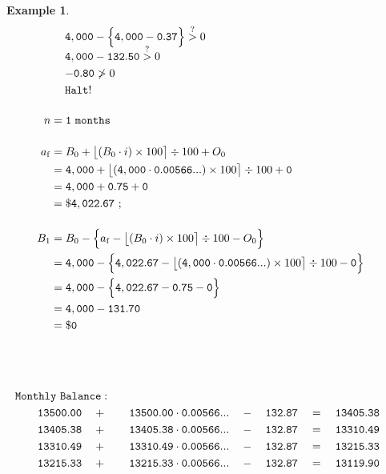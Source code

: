\documentclass[12pt,letterpaper,oneside]{article}
\newtheorem{example}{Example}[section]
\theoremstyle{remark} %
\begin{document}
\begin{example}
\begin{align*}
	&\quad\;\mathtt{\balanceitf}-\Big\{\mathtt{\amount}-\mathtt{0.37}\Big\}\overset{?}{>}0\\[-6pt]
	&\quad\;\mathtt{\balanceitf}-\mathtt{132.50}\overset{?}{>}0\\
	&\quad\;\mathtt{-0.80}\ngtr 0\\
	&\quad\;\mathtt{Halt!}\\[12pt]
	n&=\mathtt{\monthspitf\ months}\\[12pt]
	a_{\rm{f}}&=B_{\monthsitf}+\big\lfloor{\left(B_{\monthsitf}\cdot i\right)\times 100}\big\rceil\div 100+O_{\monthsitf}\\
	&=\mathtt{\balanceitf}+\big\lfloor{\left(\mathtt{\balanceitf}\cdot \mathtt{\rate}\right)\times 100}\big\rceil\div 100+\mathtt{\interestitf}\\
	&=\mathtt{\balanceitf}+\mathtt{0.75}+\mathtt{\interestitf}\\
	&=\mathtt{\$\amountfinal}\ ;\\[12pt]
	B_{\monthspitf}&=B_{\monthsitf}-\Big\{a_{\rm{f}}-\big\lfloor{\left(B_{\monthsitf}\cdot i\right)\times 100}\big\rceil\div 100-O_{\monthsitf}\Big\}\\
	&=\mathtt{\balanceitf}-\Big\{\mathtt{\amountfinal}-\big\lfloor{\left(\mathtt{\balanceitf}\cdot \mathtt{\rate}\right)\times 100}\big\rceil\div 100-\mathtt{\interestitf}\Big\}\\
	&=\mathtt{\balanceitf}-\Big\{\mathtt{\amountfinal}-\mathtt{0.75}-\mathtt{\interestitf}\Big\}\\
	&=\mathtt{\balanceitf}-\mathtt{131.70}\\
	&=\mathtt{\$0}\\[48pt] %
	&\!\!\!\!\!\!\!\!\!\!\!\!\!\!\!\!\!\!\!\mathtt{Monthly\ Balance:}\\
	&\!\!\!\!\!\!\!\mathtt{13500.00}\quad +\qquad\mathtt{13500.00}\cdot \mathtt{\rate}\quad -\quad \mathtt{132.87}\quad =\quad \mathtt{13405.38}\\
	&\!\!\!\!\!\!\!\mathtt{13405.38}\quad +\qquad\mathtt{13405.38}\cdot \mathtt{\rate}\quad -\quad \mathtt{132.87}\quad =\quad \mathtt{13310.49}\\
	&\!\!\!\!\!\!\!\mathtt{13310.49}\quad +\qquad\mathtt{13310.49}\cdot \mathtt{\rate}\quad -\quad \mathtt{132.87}\quad =\quad\mathtt{13215.33}\\
	&\!\!\!\!\!\!\!\mathtt{13215.33}\quad +\qquad\mathtt{13215.33}\cdot \mathtt{\rate}\quad -\quad \mathtt{132.87}\quad =\quad \mathtt{13119.90}\\

\end{align*}
\end{example}
\end{document}
